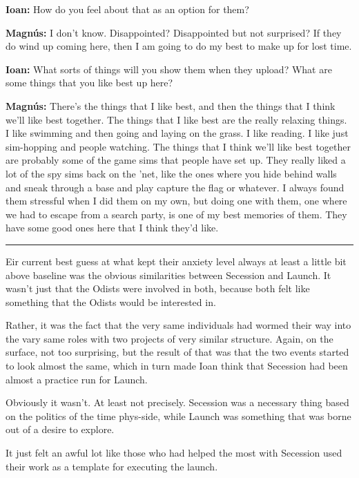\textbf{Ioan:} How do you feel about that as an option for them?

\textbf{Magnús:} I don't know. Disappointed? Disappointed but not surprised? If they do wind up coming here, then I am going to do my best to make up for lost time.

\textbf{Ioan:} What sorts of things will you show them when they upload? What are some things that you like best up here?

\textbf{Magnús:} There's the things that I like best, and then the things that I think we'll like best together. The things that I like best are the really relaxing things. I like swimming and then going and laying on the grass. I like reading. I like just sim-hopping and people watching. The things that I think we'll like best together are probably some of the game sims that people have set up. They really liked a lot of the spy sims back on the 'net, like the ones where you hide behind walls and sneak through a base and play capture the flag or whatever. I always found them stressful when I did them on my own, but doing one with them, one where we had to escape from a search party, is one of my best memories of them. They have some good ones here that I think they'd like.

\begin{center}\rule{0.5\linewidth}{0.5pt}\end{center}

Eir current best guess at what kept their anxiety level always at least a little bit above baseline was the obvious similarities between Secession and Launch. It wasn't just that the Odists were involved in both, because both felt like something that the Odists would be interested in.

Rather, it was the fact that the very same individuals had wormed their way into the vary same roles with two projects of very similar structure. Again, on the surface, not too surprising, but the result of that was that the two events started to look almost the same, which in turn made Ioan think that Secession had been almost a practice run for Launch.

Obviously it wasn't. At least not precisely. Secession was a necessary thing based on the politics of the time phys-side, while Launch was something that was borne out of a desire to explore.

It just felt an awful lot like those who had helped the most with Secession used their work as a template for executing the launch.


